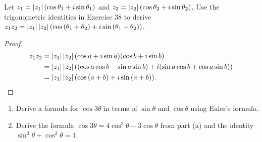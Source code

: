 \newpage
\begin{exercise}
    Let $z_{1} = \left\vert{z_{1}}\right\vert(\cos{\theta_{1}} + i\sin{\theta_{1}})$ and $z_{2} = \left\vert{z_{2}}\right\vert(\cos{\theta_{2}} + i\sin{\theta_{2}})$. Use the trigonometric identities in Exercise 38 to derive $z_{1}z_{2} = \left\vert{z_{1}}\right\vert\left\vert{z_{2}}\right\vert(\cos{(\theta_{1} + \theta_{2})} + i\sin{(\theta_{1} + \theta_{2})})$.
\end{exercise}

\begin{proof}
    \begin{align*}
        z_{1}z_{2} & = \left\vert{z_{1}}\right\vert\left\vert{z_{2}}\right\vert(\cos a + i\sin a)(\cos b + i\sin b)                             \\
                   & = \left\vert{z_{1}}\right\vert\left\vert{z_{2}}\right\vert((\cos a\cos b - \sin a\sin b) + i(\sin a\cos b + \cos a\sin b)) \\
                   & = \left\vert{z_{1}}\right\vert\left\vert{z_{2}}\right\vert(\cos{(a+b)} + i\sin{(a+b)}).
    \end{align*}
\end{proof}

\newpage
\begin{exercise}
    \begin{enumerate}[topsep=0pt,itemsep=0pt,label={\textbf{\alph*.}}]
        \item Derive a formula for $\cos{3\theta}$ in terms of $\sin{\theta}$ and $\cos{\theta}$ using Euler's formula.
        \item Derive the formula $\cos{3\theta} = 4\cos^{3}{\theta} - 3\cos{\theta}$ from part (a) and the identity $\sin^{2}{\theta} + \cos^{2}{\theta} = 1$.
    \end{enumerate}
\end{exercise}

